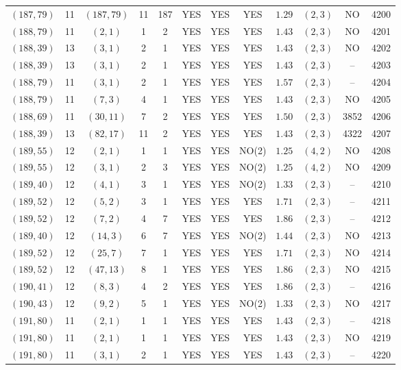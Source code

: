 \begin{longtable}{|c|c|c|c|c|c|c|c|c|c|c|c|}
$(187,79)$ & 11 & $(187,79)$ & 11 & 187 & YES & YES & YES & $1.29$ & $(2,3)$ & NO & 4200\\
$(188,79)$ & 11 & $(2,1)$ & 1 & 2 & YES & YES & YES & $1.43$ & $(2,3)$ & NO & 4201\\
$(188,39)$ & 13 & $(3,1)$ & 2 & 1 & YES & YES & YES & $1.43$ & $(2,3)$ & NO & 4202\\
$(188,39)$ & 13 & $(3,1)$ & 2 & 1 & YES & YES & YES & $1.43$ & $(2,3)$ & -- & 4203\\
$(188,79)$ & 11 & $(3,1)$ & 2 & 1 & YES & YES & YES & $1.57$ & $(2,3)$ & -- & 4204\\
$(188,79)$ & 11 & $(7,3)$ & 4 & 1 & YES & YES & YES & $1.43$ & $(2,3)$ & NO & 4205\\
$(188,69)$ & 11 & $(30,11)$ & 7 & 2 & YES & YES & YES & $1.50$ & $(2,3)$ & 3852 & 4206\\
$(188,39)$ & 13 & $(82,17)$ & 11 & 2 & YES & YES & YES & $1.43$ & $(2,3)$ & 4322 & 4207\\
$(189,55)$ & 12 & $(2,1)$ & 1 & 1 & YES & YES & NO(2) & $1.25$ & $(4,2)$ & NO & 4208\\
$(189,55)$ & 12 & $(3,1)$ & 2 & 3 & YES & YES & NO(2) & $1.25$ & $(4,2)$ & NO & 4209\\
$(189,40)$ & 12 & $(4,1)$ & 3 & 1 & YES & YES & NO(2) & $1.33$ & $(2,3)$ & -- & 4210\\
$(189,52)$ & 12 & $(5,2)$ & 3 & 1 & YES & YES & YES & $1.71$ & $(2,3)$ & -- & 4211\\
$(189,52)$ & 12 & $(7,2)$ & 4 & 7 & YES & YES & YES & $1.86$ & $(2,3)$ & -- & 4212\\
$(189,40)$ & 12 & $(14,3)$ & 6 & 7 & YES & YES & NO(2) & $1.44$ & $(2,3)$ & NO & 4213\\
$(189,52)$ & 12 & $(25,7)$ & 7 & 1 & YES & YES & YES & $1.71$ & $(2,3)$ & NO & 4214\\
$(189,52)$ & 12 & $(47,13)$ & 8 & 1 & YES & YES & YES & $1.86$ & $(2,3)$ & NO & 4215\\
$(190,41)$ & 12 & $(8,3)$ & 4 & 2 & YES & YES & YES & $1.86$ & $(2,3)$ & -- & 4216\\
$(190,43)$ & 12 & $(9,2)$ & 5 & 1 & YES & YES & NO(2) & $1.33$ & $(2,3)$ & NO & 4217\\
$(191,80)$ & 11 & $(2,1)$ & 1 & 1 & YES & YES & YES & $1.43$ & $(2,3)$ & -- & 4218\\
$(191,80)$ & 11 & $(2,1)$ & 1 & 1 & YES & YES & YES & $1.43$ & $(2,3)$ & NO & 4219\\
$(191,80)$ & 11 & $(3,1)$ & 2 & 1 & YES & YES & YES & $1.43$ & $(2,3)$ & -- & 4220\\

\end{longtable}
